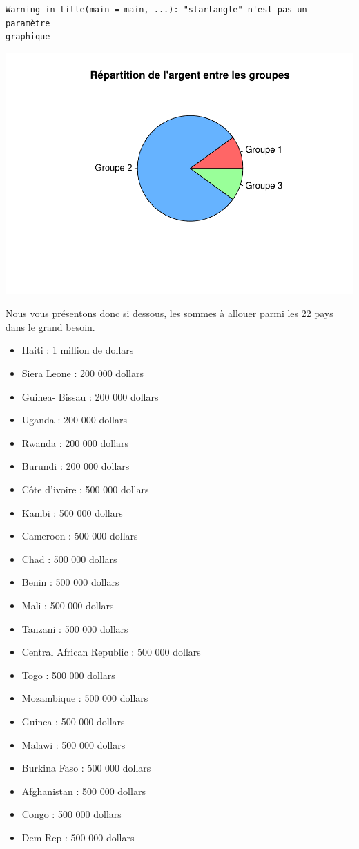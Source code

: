 \documentclass[
]{article}
\providecommand{\tightlist}{%
  \setlength{\itemsep}{0pt}\setlength{\parskip}{0pt}}
\begin{document}
\begin{verbatim}
Warning in title(main = main, ...): "startangle" n'est pas un paramètre
graphique
\end{verbatim}

\includegraphics{Projet_files/figure-latex/unnamed-chunk-46-1.pdf}

Nous vous présentons donc si dessous, les sommes à allouer parmi les 22
pays dans le grand besoin.

\begin{itemize}
\tightlist
\item
  Haiti : 1 million de dollars
\item
  Siera Leone : 200 000 dollars
\item
  Guinea- Bissau : 200 000 dollars
\item
  Uganda : 200 000 dollars
\item
  Rwanda : 200 000 dollars
\item
  Burundi : 200 000 dollars
\item
  Côte d'ivoire : 500 000 dollars
\item
  Kambi : 500 000 dollars
\item
  Cameroon : 500 000 dollars
\item
  Chad : 500 000 dollars
\item
  Benin : 500 000 dollars
\item
  Mali : 500 000 dollars
\item
  Tanzani : 500 000 dollars
\item
  Central African Republic : 500 000 dollars
\item
  Togo : 500 000 dollars
\item
  Mozambique : 500 000 dollars
\item
  Guinea : 500 000 dollars
\item
  Malawi : 500 000 dollars
\item
  Burkina Faso : 500 000 dollars
\item
  Afghanistan : 500 000 dollars
\item
  Congo : 500 000 dollars
\item
  Dem Rep : 500 000 dollars
\end{itemize}
\end{document}
